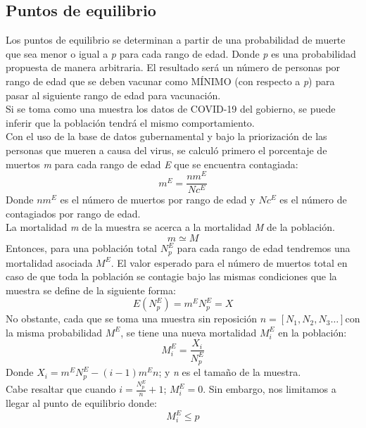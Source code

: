 \documentclass[12pt,a4paper]{article}
\begin{document}
\subsection{Puntos de equilibrio}
\setlength{\parindent}{0cm}
Los puntos de equilibrio se determinan a partir de una probabilidad de muerte que sea menor o igual a \textit{p} para cada rango de edad. Donde \textit{p} es una probabilidad propuesta de manera arbitraria. El resultado será un número de personas por rango de edad que se deben vacunar como MÍNIMO (con respecto a \textit{p}) para pasar al siguiente rango de edad para vacunación. 
\\ 
Si se toma como una muestra los datos de COVID-19 del gobierno, se puede inferir que la población tendrá el mismo comportamiento. 
\\ 
Con el uso de la base de datos gubernamental y bajo la priorización de las personas que mueren a causa del virus, se calculó primero el porcentaje de muertos \textit{m} para cada rango de edad \textit{E} que se encuentra contagiada: 
\begin{equation}
    m^E=\frac{nm^E}{Nc^E}
\end{equation}
Donde \(nm^E\) es el número de muertos por rango de edad y  \(Nc^E\) es el número de contagiados por rango de edad.
\\
La mortalidad \textit{m} de la muestra se acerca a la mortalidad \textit{M} de la población.
\begin{equation}
    m\simeq M
\end{equation}
Entonces, para una población total \(N_p^E\) para cada rango de edad tendremos una mortalidad asociada \(M^E\). El valor esperado para el número de muertos total en caso de que toda la población se contagie bajo las mismas condiciones que la muestra se define de la siguiente forma: 
\begin{equation}
    E\left(N_p^E\right)=m^EN_p^E=X
\end{equation}
No obstante, cada que se toma una muestra sin reposición \(n=\left[N_1,N_2,N_3\ldots\right]\)con la misma probabilidad \(M^E\), se tiene una nueva mortalidad \(M_i^E\) en la población: 
\begin{equation}
    M_i^E=\frac{X_i}{N_p^E}
\end{equation}
Donde \(X_i=m^EN_p^E-\left(i-1\right)m^En\); y \textit{n} es el tamaño de la muestra. 
\\
Cabe resaltar que cuando \(i=\frac{N_p^E}{n}+1\); \(M_i^E=0\). Sin embargo, nos limitamos a llegar al punto de equilibrio donde:  
\begin{equation}
    M_i^E\le p
\end{equation}
\setlength{\parindent}{1cm}
\end{document}
